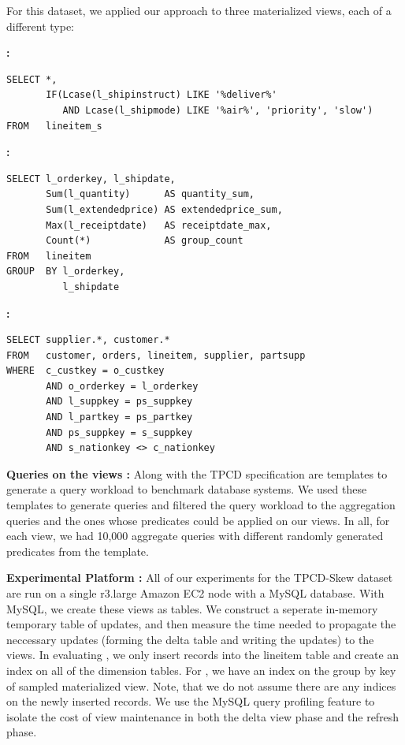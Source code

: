 For this dataset, we applied our approach to three materialized views, each of a different type:

{\noindent \bf \spview :}
\begin{lstlisting}
SELECT *, 
       IF(Lcase(l_shipinstruct) LIKE '%deliver%' 
          AND Lcase(l_shipmode) LIKE '%air%', 'priority', 'slow') 
FROM   lineitem_s 
\end{lstlisting}

\vspace{0.5em}

{\noindent \bf \aggview :}
\begin{lstlisting}
SELECT l_orderkey, l_shipdate, 
       Sum(l_quantity)      AS quantity_sum, 
       Sum(l_extendedprice) AS extendedprice_sum, 
       Max(l_receiptdate)   AS receiptdate_max, 
       Count(*)             AS group_count 
FROM   lineitem 
GROUP  BY l_orderkey, 
          l_shipdate 
\end{lstlisting}

\vspace{0.5em}

{\noindent \bf \fjview :}
\begin{lstlisting}
SELECT supplier.*, customer.* 
FROM   customer, orders, lineitem, supplier, partsupp 
WHERE  c_custkey = o_custkey 
       AND o_orderkey = l_orderkey 
       AND l_suppkey = ps_suppkey 
       AND l_partkey = ps_partkey 
       AND ps_suppkey = s_suppkey 
       AND s_nationkey <> c_nationkey 
\end{lstlisting}

\vspace{0.5em}

{\noindent \bf Queries on the views :}
Along with the TPCD specification are templates to generate a query workload to benchmark database systems.
We used these templates to generate queries and filtered the query workload to the aggregation queries and the ones whose predicates could be applied on our views.
In all, for each view, we had 10,000 aggregate queries with different randomly generated predicates from the template.

\vspace{0.5em}

{\noindent \bf Experimental Platform :}
All of our experiments for the TPCD-Skew dataset are run on a single r3.large Amazon EC2 node with a MySQL database.
With MySQL, we create these views as tables.
We construct a seperate in-memory temporary table of updates, and then measure the time needed to propagate the neccessary updates (forming the delta table and writing the updates) to the views.
In evaluating \fjview, we only insert records into the lineitem table and create an index on all of the dimension tables.
For \aggview, we have an index on the group by key of sampled materialized view.
Note, that we do not assume there are any indices on the newly inserted records.
We use the MySQL query profiling feature to isolate the cost of view maintenance in both the delta view phase and the refresh phase.

